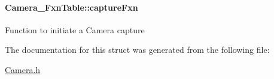 \paragraph[{capture\+Fxn}]{ Camera\+\_\+\+Fxn\+Table\+::capture\+Fxn}\label{struct_camera___fxn_table_a68229a53d38db79a70137aff58e394ff}
Function to initiate a Camera capture 

The documentation for this struct was generated from the following file\+:\begin{DoxyCompactItemize}
\item 
\hyperlink{_camera_8h}{Camera.\+h}\end{DoxyCompactItemize}
